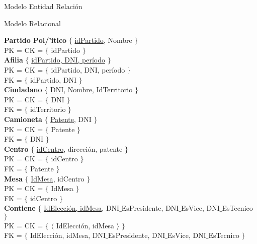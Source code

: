 \begin{section}{Modelo Entidad Relaci\'on}

\begin{subsection}{Modelo Relacional}

\textbf{Partido Pol/'itico} $\lbrace$ \underline{idPartido}, Nombre $\rbrace$ \\
PK = CK = $ \lbrace $ idPartido $ \rbrace $ \\

\textbf{Afilia} $ \lbrace $ \underline{idPartido, DNI, per\'iodo} $ \rbrace $\\
PK = CK = $ \lbrace $ idPartido, DNI, per\'iodo $ \rbrace $\\
FK = $ \lbrace $ idPartido, DNI $ \rbrace $\\

\textbf{Ciudadano} $ \lbrace $ \underline{DNI}, Nombre, IdTerritorio $ \rbrace $\\
PK = CK = $ \lbrace $ DNI $ \rbrace $\\
FK = $ \lbrace $ idTerritorio $ \rbrace $\\

\textbf{Camioneta} $ \lbrace $ \underline{Patente}, DNI $ \rbrace $\\
PK = CK = $ \lbrace $ Patente  $ \rbrace $\\
FK = $ \lbrace $ DNI $ \rbrace $\\

\textbf{Centro} $ \lbrace $ \underline{idCentro}, direcci\'on, patente $ \rbrace $ \\
PK = CK = $ \lbrace $ idCentro $ \rbrace $ \\
FK = $ \lbrace $ Patente $ \rbrace $\\

\textbf{Mesa} $ \lbrace $ \underline{IdMesa}, idCentro $ \rbrace $ \\
PK = CK = $ \lbrace $ IdMesa $ \rbrace $ \\
FK = $ \lbrace $ idCentro $ \rbrace $\\

\textbf{Contiene} $ \lbrace $ \underline{IdElecci\'on, idMesa}, DNI$\_$EsPresidente, DNI$\_$EsVice, DNI$\_$EsTecnico $ \rbrace $ \\
PK = CK = $ \lbrace $ $ \langle $ IdElecci\'on, idMesa $ \rangle $ $ \rbrace $ \\
FK = $ \lbrace $ IdElecci\'on, idMesa, DNI$\_$EsPresidente, DNI$\_$EsVice, DNI$\_$EsTecnico $ \rbrace $\\


\end{subsection}
\end{section}
